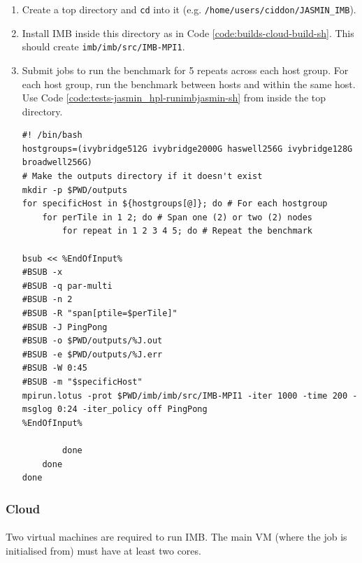 \documentclass{article}
\newenvironment{code}{\captionsetup{type=listing}}{}
\begin{document}
            \begin{enumerate}
                \item Create a top directory and \verb|cd| into it (e.g. \verb|/home/users/ciddon/JASMIN_IMB|).
                \item Install IMB inside this directory as in Code \ref{code:builds-cloud-build-sh}. This should create \verb|imb/imb/src/IMB-MPI1|.
                \item Submit jobs to run the benchmark for 5 repeats across each host group. For each host group, run the benchmark between hosts and within the same host. Use Code \ref{code:tests-jasmin_hpl-runimbjasmin-sh} from inside the top directory.

                    \begin{code}
                    \label{code:tests-jasmin_hpl-runimbjasmin-sh}
                    \begin{verbatim}
#! /bin/bash
hostgroups=(ivybridge512G ivybridge2000G haswell256G ivybridge128G broadwell256G)
# Make the outputs directory if it doesn't exist
mkdir -p $PWD/outputs
for specificHost in ${hostgroups[@]}; do # For each hostgroup
    for perTile in 1 2; do # Span one (2) or two (2) nodes
        for repeat in 1 2 3 4 5; do # Repeat the benchmark

bsub << %EndOfInput%
#BSUB -x
#BSUB -q par-multi
#BSUB -n 2
#BSUB -R "span[ptile=$perTile]"
#BSUB -J PingPong
#BSUB -o $PWD/outputs/%J.out
#BSUB -e $PWD/outputs/%J.err
#BSUB -W 0:45
#BSUB -m "$specificHost"
mpirun.lotus -prot $PWD/imb/imb/src/IMB-MPI1 -iter 1000 -time 200 -msglog 0:24 -iter_policy off PingPong
%EndOfInput%

        done
    done
done
                    \end{verbatim}
                    \end{code}
            \end{enumerate}
        \subsubsection{Cloud}

            \paragraph{}
            Two virtual machines are required to run IMB. The main VM (where the job is initialised from) must have at least two cores.
\end{document}
